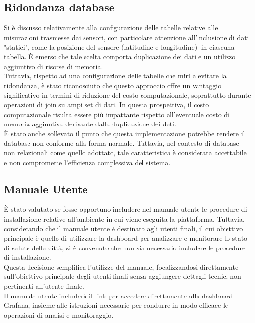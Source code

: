\documentclass{article}
\begin{document}
    \subsection{Ridondanza database}
    Si è discusso relativamente alla configurazione delle tabelle relative alle misurazioni trasmesse dai sensori, con particolare attenzione all'inclusione di dati "statici", come la posizione del sensore (latitudine e longitudine), in ciascuna tabella. È emerso che tale scelta comporta duplicazione dei dati e un utilizzo aggiuntivo di risorse di memoria. \\
    Tuttavia, rispetto ad una configurazione delle tabelle che miri a evitare la ridondanza, è stato riconosciuto che questo approccio offre un vantaggio significativo in termini di riduzione del costo computazionale, soprattutto durante operazioni di join su ampi set di dati. In questa prospettiva, il costo computazionale risulta essere più impattante rispetto all'eventuale costo di memoria aggiuntiva derivante dalla duplicazione dei dati. \\
    È stato anche sollevato il punto che questa implementazione potrebbe rendere il database non conforme alla forma normale. Tuttavia, nel contesto di database non relazionali come quello adottato, tale caratteristica è considerata accettabile e non compromette l'efficienza complessiva del sistema.


    \subsection{Manuale Utente}
    È stato valutato se fosse opportuno includere nel manuale utente le procedure di installazione relative all'ambiente in cui viene eseguita la piattaforma. Tuttavia, considerando che il manuale utente è destinato agli utenti finali, il cui obiettivo principale è quello di utilizzare la dashboard per analizzare e monitorare lo stato di salute della città, si è convenuto che non sia necessario includere le procedure di installazione. \\
    Questa decisione semplifica l'utilizzo del manuale, focalizzandosi direttamente sull'obiettivo principale degli utenti finali senza aggiungere dettagli tecnici non pertinenti all'utente finale. \\
    Il manuale utente includerà il link per accedere direttamente alla dashboard Grafana, insieme alle istruzioni necessarie per condurre in modo efficace le operazioni di analisi e monitoraggio.
\end{document}
